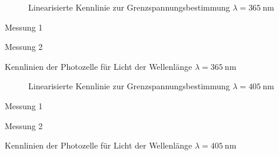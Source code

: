 \begin{figure}
	\centering
	
	\caption{Linearisierte Kennlinie zur Grenzspannungsbestimmung $\lambda = \SI{365}{\nano\metre}$}
	\label{fig:kennlinien_365nm}
\end{figure}

\begin{table}
	\centering
	\begin{subtable}{0.5\textwidth}
		\centering
		\vspace{0pt}
		\resizebox{0.95\columnwidth}{!}{%
			
		}
		\caption{Messung 1}
	\end{subtable}%
	\begin{subtable}{0.5\textwidth}
		\centering
		\vspace{0pt}
		\resizebox{0.95\columnwidth}{!}{%
			
		}
		\caption{Messung 2}
	\end{subtable}

	\caption{Kennlinien der Photozelle f\"ur Licht der Wellenl\"ange $\lambda=\SI{365}{\nano\metre}$}
\end{table}



\begin{figure}
	\centering
	
	\caption{Linearisierte Kennlinie zur Grenzspannungsbestimmung $\lambda = \SI{405}{\nano\metre}$}
	\label{fig:kennlinien_405nm}
\end{figure}

\begin{table}
	\centering
	\begin{subtable}{0.5\textwidth}
		\centering
		\vspace{0pt}
		\resizebox{0.95\columnwidth}{!}{%
			
		}
		\caption{Messung 1}
	\end{subtable}%
	\begin{subtable}{0.5\textwidth}
		\centering
		\vspace{0pt}
		\resizebox{0.95\columnwidth}{!}{%
			
		}
		\caption{Messung 2}
	\end{subtable}

	\caption{Kennlinien der Photozelle f\"ur Licht der Wellenl\"ange $\lambda = \SI{405}{\nano\metre}$}
\end{table}



